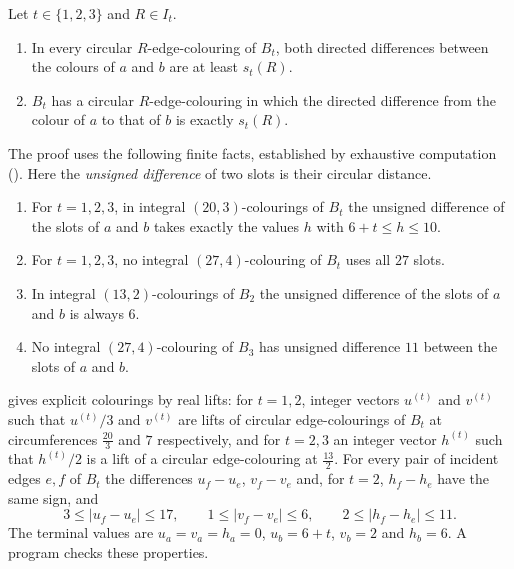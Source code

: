 \documentclass[11pt,colorlinks]{charlie}
\begin{document}
\begin{proposition}\label{prop:blocks}
Let $t\in\{1,2,3\}$ and $R\in I_t$.
\begin{enumerate}
\item\label{it:blow} In every circular $R$-edge-colouring of $B_t$, both directed differences between the colours of $a$ and $b$ are at least $s_t(R)$.
\item\label{it:bup} $B_t$ has a circular $R$-edge-colouring in which the directed difference from the colour of $a$ to that of $b$ is exactly $s_t(R)$.
\end{enumerate}
\end{proposition}

The proof uses the following finite facts, established by exhaustive computation (). Here the \emph{unsigned difference} of two slots is their circular distance.
\begin{enumerate}
\item[(F1)] For $t=1,2,3$, in integral $(20,3)$-colourings of $B_t$ the unsigned difference of the slots of $a$ and $b$ takes exactly the values $h$ with $6+t\le h\le10$.
\item[(F2)] For $t=1,2,3$, no integral $(27,4)$-colouring of $B_t$ uses all $27$ slots.
\item[(F3)] In integral $(13,2)$-colourings of $B_2$ the unsigned difference of the slots of $a$ and $b$ is always $6$.
\item[(F4)] No integral $(27,4)$-colouring of $B_3$ has unsigned difference $11$ between the slots of $a$ and $b$.
\end{enumerate}
 gives explicit colourings by real lifts: for $t=1,2$, integer vectors $u^{(t)}$ and $v^{(t)}$ such that $u^{(t)}/3$ and $v^{(t)}$ are lifts of circular edge-colourings of $B_t$ at circumferences $\frac{20}{3}$ and $7$ respectively, and for $t=2,3$ an integer vector $h^{(t)}$ such that $h^{(t)}/2$ is a lift of a circular edge-colouring at $\frac{13}{2}$. For every pair of incident edges $e,f$ of $B_t$ the differences $u_f-u_e$, $v_f-v_e$ and, for $t=2$, $h_f-h_e$ have the same sign, and
\[
3\le|u_f-u_e|\le17,\qquad 1\le|v_f-v_e|\le6,\qquad 2\le|h_f-h_e|\le11 .
\]
The terminal values are $u_a=v_a=h_a=0$, $u_b=6+t$, $v_b=2$ and $h_b=6$. A program checks these properties.
\end{document}
